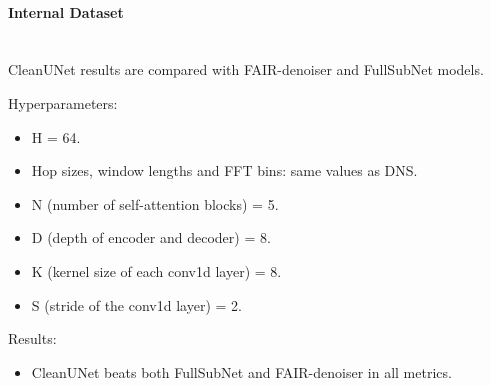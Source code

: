 \paragraph{Internal Dataset}\mbox{}\\
CleanUNet results are compared with FAIR-denoiser and FullSubNet models.

Hyperparameters:
\begin{itemize}
    \item H = 64.
    \item Hop sizes, window lengths and FFT bins: same values as DNS.
    \item N (number of self-attention blocks) = 5.
    \item D (depth of encoder and decoder) = 8.
    \item K (kernel size of each conv1d layer) = 8.
    \item S (stride of the conv1d layer) = 2.
\end{itemize}
Results:
\begin{itemize}
    \item CleanUNet beats both FullSubNet and FAIR-denoiser in all metrics.
\end{itemize}